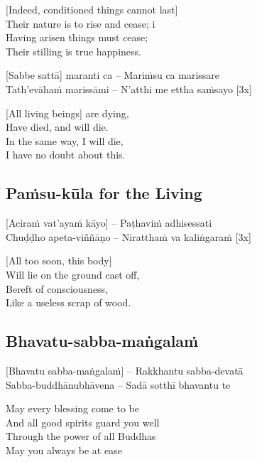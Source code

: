 \begin{english}
  [Indeed, conditioned things cannot last]\\
  Their nature is to rise and cease; i\\
  Having arisen things must cease;\\
  Their stilling is true happiness.
\end{english}

\suttaRef{[DN 16]}

[Sabbe sattā] maranti ca – Mariṁsu ca marissare\\
Tath'evāhaṁ marissāmi – N'atthi me ettha saṁsayo \hfill{[3x]}

\begin{english}
  [All living beings] are dying,\\
  Have died, and will die.\\
  In the same way, I will die,\\
  I have no doubt about this.
\end{english}

\suttaRef{[Thai]}

\subsection{Paṁsu-kūla for the Living}
\label{pamsu-kula-living}
[Aciraṁ vat'ayaṁ kāyo] – Paṭhaviṁ adhisessati\\
Chuḍḍho apeta-viññāṇo – Niratthaṁ va kaliṅgaraṁ \hfill{[3x]}

\begin{english}
  [All too soon, this body]\\
  Will lie on the ground cast off,\\
  Bereft of consciousness,\\
  Like a useless scrap of wood.
\end{english}

\suttaRef{[Dhp 41]}

\subsection{Bhavatu-sabba-maṅgalaṁ}
\label{bhavtu}

[Bhavatu sabba-maṅgalaṁ] – Rakkhantu sabba-devatā\\
Sabba-buddhānubhāvena – Sadā sotthī bhavantu te

\begin{english}
  May every blessing come to be\\
  And all good spirits guard you well\\
  Through the power of all Buddhas\\
  May you always be at ease
\end{english}

